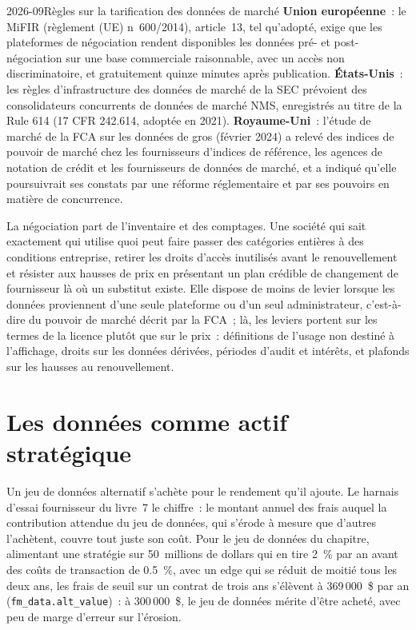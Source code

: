 \begin{dated}{2026-09}{Règles sur la tarification des données de marché}\label{dat:fm:data-strategy-and-costs:rules}
\textbf{Union européenne}~: le MiFIR (règlement (UE) n~600/2014), article~13, tel qu'adopté, exige que les plateformes de négociation rendent disponibles les données pré- et post-négociation
sur une base commerciale raisonnable, avec un accès non discriminatoire, et gratuitement quinze minutes après publication. \textbf{États-Unis}~:
les règles d'infrastructure des données de marché de la SEC prévoient des consolidateurs concurrents de données de marché NMS, enregistrés au titre de la Rule 614 (17 CFR
242.614, adoptée en 2021). \textbf{Royaume-Uni}~: l'étude de marché de la FCA sur les données de gros (février 2024) a relevé des indices de pouvoir de marché chez les fournisseurs d'indices de référence, les agences de notation de crédit et les fournisseurs de données de marché,
et a indiqué qu'elle poursuivrait ses constats par une réforme réglementaire et par ses pouvoirs
en matière de concurrence.
\end{dated}

La négociation part de l'inventaire et des comptages. Une société qui sait exactement qui utilise quoi peut faire passer des catégories entières à des conditions entreprise, retirer
les droits d'accès inutilisés avant le renouvellement et résister aux hausses de prix en présentant un plan crédible de changement de fournisseur là où un substitut existe. Elle dispose de moins de levier lorsque
les données proviennent d'une seule plateforme ou d'un seul administrateur, c'est-à-dire du pouvoir de marché décrit par la FCA~; là, les leviers portent sur les termes de la licence plutôt que sur le prix~:
définitions de l'usage non destiné à l'affichage, droits sur les données dérivées, périodes d'audit et intérêts, et plafonds sur les hausses au renouvellement.

\section{Les données comme actif stratégique}

Un jeu de données alternatif s'achète pour le rendement qu'il ajoute. Le harnais d'essai fournisseur du livre~7 le chiffre~: le montant annuel des frais auquel la contribution attendue
du jeu de données, qui s'érode à mesure que d'autres l'achètent, couvre tout juste son coût. Pour le jeu de données du chapitre, alimentant une stratégie sur 50~millions de dollars qui en tire 2~\% par an
avant des coûts de transaction de 0.5~\%, avec un edge qui se réduit de moitié tous les deux ans, les frais de seuil sur un contrat de trois ans s'élèvent à 369\,000~\$ par an
(\texttt{fm\_data.alt\_value})~: à 300\,000~\$, le jeu de données mérite d'être acheté, avec peu de marge d'erreur sur l'érosion.

